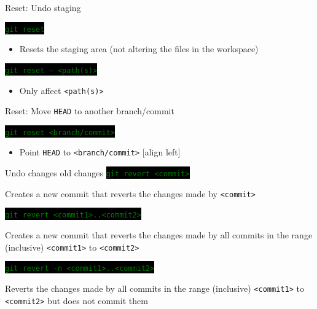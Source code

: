 \documentclass[
14pt,
aspectratio=169,
usenames,
dvipsnames,
x11names]{beamer}
\newcommand{\code}[1]{{\small\colorbox{black}{\textcolor{green}{\texttt{#1}}}}}
\begin{document}
\begin{frame}{Reset: Undo staging}

  \code{git reset}
  \begin{itemize}
  \item Resets the staging area (not altering the files in the workspace)
  \end{itemize}

  \vfill
  \pause

  \code{git reset -- <path(s)>}
  \begin{itemize}
  \item Only affect \texttt{<path(s)>}
  \end{itemize}
\end{frame}

\begin{frame}{Reset: Move \texttt{HEAD} to another branch/commit}

  \code{git reset <branch/commit>}
  \begin{itemize}
  \item Point \texttt{HEAD} to \texttt{<branch/commit>}
    [align left]
  \end{itemize}
\end{frame}

\begin{frame}{Undo changes old changes}
  \code{git revert <commit>}

  Creates a new commit that reverts the changes made by \texttt{<commit>}

  \vfill
  \pause

  \code{git revert <commit1>..<commit2>}

  Creates a new commit that reverts the changes made by all commits in the range (inclusive) \texttt{<commit1>} to \texttt{<commit2>}

  \vfill
  \pause

  \code{git revert -n <commit1>..<commit2>}

  Reverts the changes made by all commits in the range (inclusive) \texttt{<commit1>} to \texttt{<commit2>} but does not commit them
\end{frame}
\end{document}
